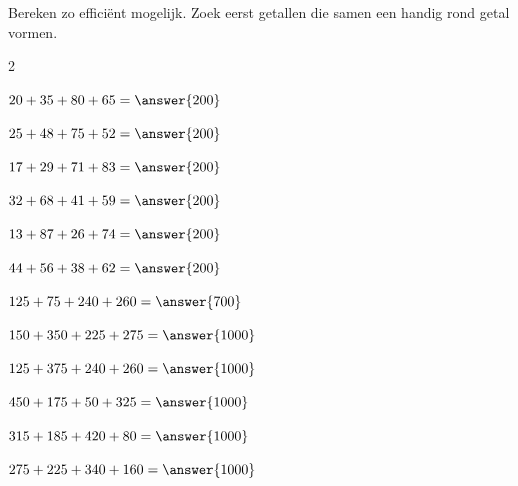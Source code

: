 \documentclass{ximera}
\begin{document}
\begin{oefening}{\oefB\ESS}

    Bereken zo efficiënt mogelijk. Zoek eerst getallen die samen een handig
    rond getal vormen.
    
    \begin{multicols}{2}
    
    \begin{question} \(20+35+80+65=\answer{200}\) \end{question}
    
    \begin{question} \(25+48+75+52=\answer{200}\) \end{question}
    
    \begin{question} \(17+29+71+83=\answer{200}\) \end{question}
    
    \begin{question} \(32+68+41+59=\answer{200}\) \end{question}
    
    \begin{question} \(13+87+26+74=\answer{200}\) \end{question}
    
    \begin{question} \(44+56+38+62=\answer{200}\) \end{question}
    
    \begin{question} \(125+75+240+260=\answer{700}\) \end{question}
    
    \begin{question} \(150+350+225+275=\answer{1000}\) \end{question}
    
    \begin{question} \(125+375+240+260=\answer{1000}\) \end{question}
    
    \begin{question} \(450+175+50+325=\answer{1000}\) \end{question}
    
    \begin{question} \(315+185+420+80=\answer{1000}\) \end{question}
    
    \begin{question} \(275+225+340+160=\answer{1000}\) \end{question}
    

\end{multicols}
\end{oefening}
\end{document}
